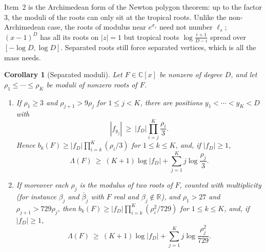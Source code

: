 \documentclass[11pt]{article}
\newtheorem{corollary}[theorem]{Corollary}
\newcommand{\R}{\mathbb R}
\begin{document}
Item~2 is the Archimedean form of the Newton polygon theorem: up to the
factor $3$, the moduli of the roots can only sit at the tropical roots.
Unlike the non-Archimedean case, the roots of modulus near $e^{\sigma_s}$ need not
number $\ell_s$; $(x-1)^D$ has all its roots on $|z|=1$ but
tropical roots $\log\frac{i+1}{D-i}$ spread over $[-\log D,\log D]$.
Separated roots still force separated vertices, which is all the mass needs.

\begin{corollary}[Separated moduli]\label{cor:separated}
Let $F\in\mathbb C[x]$ be nonzero of degree $D$, and let
$\rho_1\le\cdots\le\rho_K$ be moduli of nonzero roots of $F$.
\begin{enumerate}
\item If $\rho_1\ge3$ and $\rho_{j+1}>9\rho_j$ for $1\le j<K$, there are
positions $y_1<\cdots<y_K<D$ with
\[
  |f_{y_j}|\ \ge\ |f_D|\prod_{i=j}^K\frac{\rho_i}3 .
\]
Hence $b_k(F)\ge|f_D|\prod_{i=k}^K(\rho_i/3)$ for $1\le k\le K$, and, if
$|f_D|\ge1$,
\[
  \Lambda(F)\ \ge\ (K+1)\log|f_D|+\sum_{j=1}^Kj\log\frac{\rho_j}3 .
\]
\item If moreover each $\rho_j$ is the modulus of two roots of $F$, counted
with multiplicity (for instance $\beta_j$ and $\bar\beta_j$ with $F$ real and
$\beta_j\notin\R$), and $\rho_1>27$ and $\rho_{j+1}>729\rho_j$, then
$b_k(F)\ge|f_D|\prod_{i=k}^K(\rho_i^2/729)$ for $1\le k\le K$, and, if
$|f_D|\ge1$,
\[
  \Lambda(F)\ \ge\ (K+1)\log|f_D|+\sum_{j=1}^Kj\log\frac{\rho_j^2}{729} .
\]
\end{enumerate}
\end{corollary}
\end{document}

